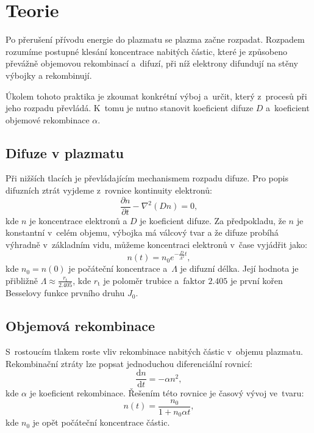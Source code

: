 \documentclass{protokol}
\newcommand\euler{e}
\newcommand\tm{t}
\newcommand\dens{n}
\newcommand\densinit{n_0}
\newcommand\diffuse{D}
\newcommand\recomb{\alpha}
\newcommand\diffuselen{\Lambda}
\newcommand\tuberadius{r_\mathrm{t}}
\begin{document}
\header

\section{Teorie}
Po přerušení přívodu energie do plazmatu se plazma začne rozpadat.
Rozpadem rozumíme postupné klesání koncentrace nabitých částic,
které je způsobeno převážně objemovou rekombinací a~difuzí,
při níž elektrony difundují na stěny výbojky a rekombinují.

Úkolem tohoto praktika je zkoumat konkrétní výboj a~určit,
který z~procesů při jeho rozpadu převládá.
K~tomu je nutno stanovit koeficient difuze $\diffuse$
a~koeficient objemové rekombinace $\recomb$.

\subsection{Difuze v plazmatu}
Při nižších tlacích je převládajícím mechanismem rozpadu difuze.
Pro popis difuzních ztrát vyjdeme z~rovnice kontinuity elektronů:
\begin{equation}
	\label{eq:continuity}
	\frac{\partial \dens}{\partial \tm} - \nabla^2 (\diffuse\dens) = 0,
\end{equation}
kde $\dens$ je koncentrace elektronů a $\diffuse$ je koeficient difuze.
Za předpokladu, že $\dens$ je konstantní v~celém objemu,
výbojka má válcový tvar a že difuze probíhá výhradně v~základním vidu,
můžeme koncentraci elektronů v~čase vyjádřit jako:
\begin{equation}
	\label{eq:dens-diffuse}
	\dens(\tm)= \densinit\euler^{-\frac{\diffuse}{\diffuselen^2}\tm},
\end{equation}
kde $\densinit = \dens(0)$ je počáteční koncentrace
a~$\diffuselen$ je difuzní délka.
Její hodnota je přibližně $\diffuselen \approx \frac{\tuberadius}{\num{2.405}}$,
kde $\tuberadius$ je poloměr trubice a~faktor $\num{2.405}$ je první kořen
Besselovy funkce prvního druhu $J_0$.

\subsection{Objemová rekombinace}
S~rostoucím tlakem roste vliv rekombinace nabitých částic v~objemu plazmatu.
Rekombinační ztráty lze popsat jednoduchou diferenciální rovnicí:
\begin{equation}
	\label{eq:dens-recomb}
	\frac{\mathrm{d} n}{\mathrm{d} t} = -\recomb \dens^2,
\end{equation}
kde $\recomb$ je koeficient rekombinace.
Řešením této rovnice je časový vývoj ve~tvaru:
\begin{equation}
	\dens(\tm)= \frac{\densinit}{1 + \densinit\recomb\tm},
\end{equation}
kde $\densinit$ je opět počáteční koncentrace částic.
\end{document}
